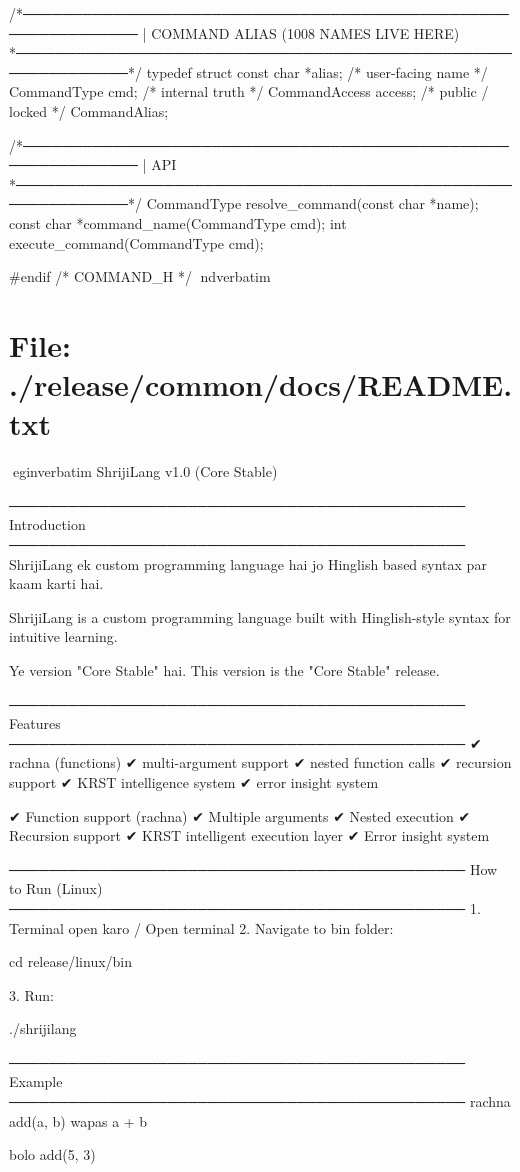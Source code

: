 \documentclass{article}
\begin{document}
/*──────────────────────────────────────────────────────────────
 | COMMAND ALIAS (1008 NAMES LIVE HERE)
 *──────────────────────────────────────────────────────────────*/
typedef struct {
    const char     *alias;     /* user-facing name */
    CommandType     cmd;       /* internal truth */
    CommandAccess   access;    /* public / locked */
} CommandAlias;


/*──────────────────────────────────────────────────────────────
 | API
 *──────────────────────────────────────────────────────────────*/
CommandType resolve_command(const char *name);
const char *command_name(CommandType cmd);
int execute_command(CommandType cmd);

#endif /* COMMAND_H */
nd{verbatim}
\section*{File: ./release/common/docs/README.txt}
egin{verbatim}
ShrijiLang v1.0 (Core Stable)

──────────────────────────────────────────────
Introduction
──────────────────────────────────────────────
ShrijiLang ek custom programming language hai
jo Hinglish based syntax par kaam karti hai.

ShrijiLang is a custom programming language
built with Hinglish-style syntax for intuitive learning.

Ye version "Core Stable" hai.
This version is the "Core Stable" release.

──────────────────────────────────────────────
Features
──────────────────────────────────────────────
✔ rachna (functions)
✔ multi-argument support
✔ nested function calls
✔ recursion support
✔ KRST intelligence system
✔ error insight system

✔ Function support (rachna)
✔ Multiple arguments
✔ Nested execution
✔ Recursion support
✔ KRST intelligent execution layer
✔ Error insight system

──────────────────────────────────────────────
How to Run (Linux)
──────────────────────────────────────────────
1. Terminal open karo / Open terminal
2. Navigate to bin folder:

   cd release/linux/bin

3. Run:

   ./shrijilang

──────────────────────────────────────────────
Example
──────────────────────────────────────────────
rachna add(a, b) {
    wapas a + b
}

bolo add(5, 3)
\end{document}
